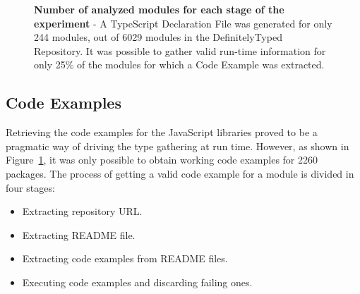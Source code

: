 \documentclass[a4paper,english,cleveref, autoref]{lipics-v2019}
\newcommand{\figref}[1]{Figure~\ref{#1}}
\begin{document}
\begin{figure}[tp]
	\hspace*{-0.16\textwidth}
	\centering
	\caption[Number of analyzed modules for each stage of the experiment]{\textbf{Number of analyzed modules for each stage of the experiment} - A TypeScript Declaration File was generated for only 244 modules, out of 6029 modules in the DefinitelyTyped Repository. It was possible to gather valid run-time information for only 25\% of the modules for which a Code Example was extracted.}
	\label{fig:experiments-overall-funnel}
\end{figure}

\subsection{Code Examples}
Retrieving the code examples for the JavaScript libraries proved to be
a pragmatic way of driving the type gathering at run time. However, as
shown in \figref{fig:experiments-overall-funnel}, it was only possible
to obtain working code examples for 2260 packages. The
process of getting a valid code example for a module is divided in four
stages: 
\begin{itemize}
\item Extracting repository URL.
\item Extracting README file.
\item Extracting code examples from README files.
\item Executing code examples and discarding failing ones.
\end{itemize}
\end{document}
